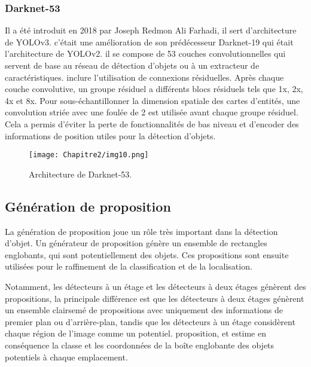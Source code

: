            \subsubsection{Darknet-53} \cite{darknet_paper}
           Il a été introduit en 2018 par Joseph Redmon Ali Farhadi, il sert d'architecture de YOLOv3. c'était une amélioration de son prédécesseur Darknet-19 qui était l'architecture de YOLOv2. il se compose de 53 couches convolutionnelles qui servent de base au réseau de détection d'objets ou à un extracteur de caractéristiques. inclure l'utilisation de connexions résiduelles. Après chaque couche convolutive, un groupe résiduel a différents blocs résiduels tels que 1x, 2x, 4x et 8x. Pour sous-échantillonner la dimension spatiale des cartes d'entités, une convolution striée avec une foulée de 2 est utilisée avant chaque groupe résiduel. Cela a permis d'éviter la perte de fonctionnalités de bas niveau et d'encoder des informations de position utiles pour la détection d'objets.
           \begin{figure}[H]
                \centering
                \texttt{[image: Chapitre2/img10.png]}
                \caption{Architecture de Darknet-53.}
                \label{img10}
                \end{figure}


     \subsection{Génération de proposition}
     La génération de proposition joue un rôle très important dans la détection d'objet. Un générateur de proposition génère un ensemble de rectangles englobants, qui sont potentiellement des objets. Ces propositions sont ensuite utilisées pour le raffinement de la classification et de la localisation. 
     
     Notamment, les détecteurs à un étage et les détecteurs à deux étages génèrent des propositions, la principale différence est que les détecteurs à deux étages génèrent un ensemble clairsemé de propositions avec uniquement des informations de premier plan ou d'arrière-plan, tandis que les détecteurs à un étage considèrent chaque région de l'image comme un potentiel. proposition, et estime en conséquence la classe et les coordonnées de la boîte englobante des objets potentiels à chaque emplacement.
     
